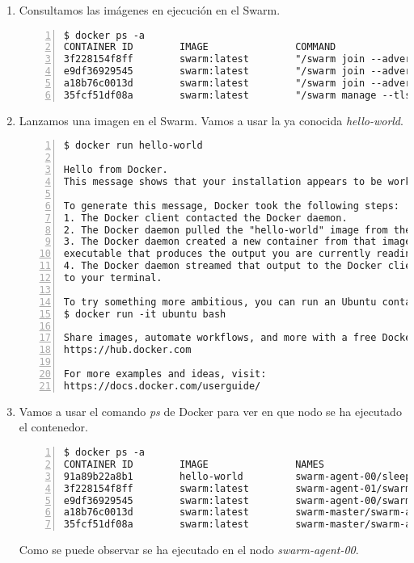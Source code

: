 \begin{enumerate}
				\item Consultamos las imágenes en ejecución en el Swarm.
				\begin{lstlisting}[style=consola,numbers=left]
$ docker ps -a
CONTAINER ID        IMAGE               COMMAND                  CREATED             STATUS              PORTS               NAMES
3f228154f8ff        swarm:latest        "/swarm join --advert"   20 minutes ago      Up 20 minutes                           swarm-agent-01/swarm-agent
e9df36929545        swarm:latest        "/swarm join --advert"   22 minutes ago      Up 22 minutes                           swarm-agent-00/swarm-agent
a18b76c0013d        swarm:latest        "/swarm join --advert"   27 minutes ago      Up 27 minutes                           swarm-master/swarm-agent
35fcf51df08a        swarm:latest        "/swarm manage --tlsv"   27 minutes ago      Up 27 minutes                           swarm-master/swarm-agent-master
				\end{lstlisting}
				
				\item Lanzamos una imagen en el Swarm. Vamos a usar la ya conocida \textit{hello-world}.
				\begin{lstlisting}[style=consola,numbers=left]
$ docker run hello-world

Hello from Docker.
This message shows that your installation appears to be working correctly.

To generate this message, Docker took the following steps:
1. The Docker client contacted the Docker daemon.
2. The Docker daemon pulled the "hello-world" image from the Docker Hub.
3. The Docker daemon created a new container from that image which runs the
executable that produces the output you are currently reading.
4. The Docker daemon streamed that output to the Docker client, which sent it
to your terminal.

To try something more ambitious, you can run an Ubuntu container with:
$ docker run -it ubuntu bash

Share images, automate workflows, and more with a free Docker Hub account:
https://hub.docker.com

For more examples and ideas, visit:
https://docs.docker.com/userguide/
				\end{lstlisting}
				
				\item Vamos a usar el comando \textit{ps} de Docker para ver en que nodo se ha ejecutado el contenedor.
				\begin{lstlisting}[style=consola,numbers=left]
$ docker ps -a
CONTAINER ID        IMAGE               NAMES
91a89b22a8b1        hello-world         swarm-agent-00/sleepy_perlman
3f228154f8ff        swarm:latest        swarm-agent-01/swarm-agent
e9df36929545        swarm:latest        swarm-agent-00/swarm-agent
a18b76c0013d        swarm:latest        swarm-master/swarm-agent
35fcf51df08a        swarm:latest        swarm-master/swarm-agent-master
				\end{lstlisting}
				
				Como se puede observar se ha ejecutado en el nodo \textit{swarm-agent-00}.
			\end{enumerate}
			
